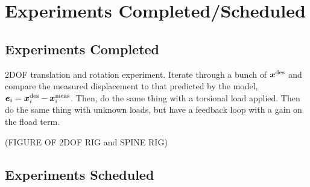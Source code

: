 \section{Experiments Completed/Scheduled}   \label{sec:experiments}

\subsection{Experiments Completed}
2DOF translation and rotation experiment. Iterate through a bunch of $\x^\tx{des}$ and compare the measured displacement to that predicted by the model, $\vec{e}_i = \x^\tx{des}_i - \x^\tx{meas}_i$. Then, do the same thing with a torsional load applied. Then do the same thing with unknown loads, but have a feedback loop with a gain on the fload term.

(FIGURE OF 2DOF RIG and SPINE RIG)


\subsection{Experiments Scheduled}
